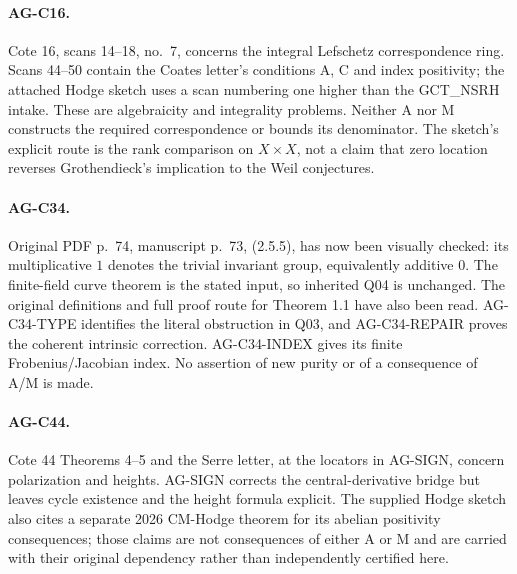 \paragraph{AG-C16.} Cote 16, scans 14--18, no.~7, concerns the integral
Lefschetz correspondence ring. Scans 44--50 contain the Coates letter's
conditions A, C and index positivity; the attached Hodge sketch uses a scan
numbering one higher than the GCT\_NSRH intake. These are algebraicity and
integrality problems. Neither A nor M constructs the required
correspondence or bounds its denominator. The sketch's explicit route is
the rank comparison on $X\times X$, not a claim that zero location
reverses Grothendieck's implication to the Weil conjectures.

\paragraph{AG-C34.} Original PDF p.~74, manuscript p.~73, (2.5.5),
has now been visually checked: its multiplicative $1$ denotes the trivial
invariant group, equivalently additive $0$. The finite-field curve theorem
is the stated input, so inherited Q04 is unchanged. The original
definitions and full proof route for Theorem 1.1 have also been read.
AG-C34-TYPE identifies the literal obstruction in Q03, and
AG-C34-REPAIR proves the coherent intrinsic correction. AG-C34-INDEX
gives its finite Frobenius/Jacobian index. No assertion of new purity or
of a consequence of A/M is made.

\paragraph{AG-C44.} Cote 44 Theorems 4--5 and the Serre letter, at the
locators in AG-SIGN, concern polarization and heights. AG-SIGN corrects
the central-derivative bridge but leaves cycle existence and the
height formula explicit. The supplied Hodge sketch also cites a separate
2026 CM-Hodge theorem for its abelian positivity consequences; those
claims are not consequences of either A or M and are carried with
their original dependency rather than independently certified here.

